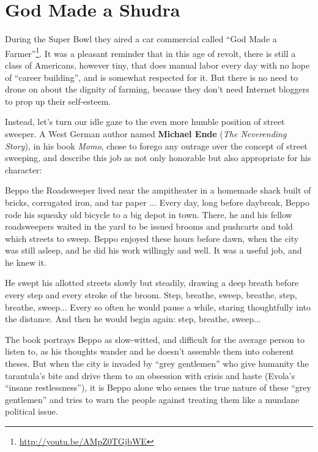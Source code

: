 \section{God Made a Shudra}

During the Super Bowl they aired a car commercial called ``God Made a Farmer''\footnote{\url{http://youtu.be/AMpZ0TGjbWE}}. It was a pleasant reminder that in this age of revolt, there is still a class of Americans, however tiny, that does manual labor every day with no hope of ``career building'', and is somewhat respected for it. But there is no need to drone on about the dignity of farming, because they don't need Internet bloggers to prop up their self-esteem.

Instead, let's turn our idle gaze to the even more humble position of street sweeper. A West German author named \textbf{Michael Ende} (\emph{The Neverending Story}), in his book \emph{Momo}, chose to forego any outrage over the concept of street sweeping, and describe this job as not only honorable but also appropriate for his character:

\begin{quotationx}
Beppo the Roadsweeper lived near the ampitheater in a homemade shack built of bricks, corrugated iron, and tar paper ... Every day, long before daybreak, Beppo rode his squeaky old bicycle to a big depot in town. There, he and his fellow roadsweepers waited in the yard to be issued brooms and pushcarts and told which streets to sweep. Beppo enjoyed these hours before dawn, when the city was still asleep, and he did his work willingly and well. It was a useful job, and he knew it.

He swept his allotted streets slowly but steadily, drawing a deep breath before every step and every stroke of the broom. Step, breathe, sweep, breathe, step, breathe, sweep... Every so often he would pause a while, staring thoughtfully into the distance. And then he would begin again: step, breathe, sweep... 
\end{quotationx}

The book portrays Beppo as slow-witted, and difficult for the average person to listen to, as his thoughts wander and he doesn't assemble them into coherent theses. But when the city is invaded by ``grey gentlemen'' who give humanity the tarantula's bite and drive them to an obsession with crisis and haste (Evola's ``insane restlessness''), it is Beppo alone who senses the true nature of these ``grey gentlemen'' and tries to warn the people against treating them like a mundane political issue.

